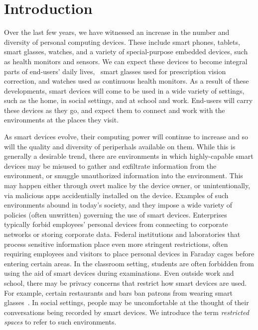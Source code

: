 \section{Introduction}
\label{section:introduction}

Over the last few years, we have witnessed an increase in the number and
diversity of personal computing devices. These include smart phones, tablets,
smart glasses, watches, and a variety of special-purpose embedded devices, such
as health monitors and sensors. We can expect these devices to become integral
parts of end-users' daily lives, \eg~smart glasses used for prescription vision
correction, and watches used as continuous health monitors. As a result of
these developments, smart devices will come to be used in a wide variety of
settings, such as the home, in social settings, and at school and work.
End-users will carry these devices as they go, and expect them to connect and
work with the environments at the places they visit.

%
As smart devices evolve, their computing power will continue to increase and so
will the quality and diversity of periperhals available on them. While this is
generally a desirable trend, there are environments in which highly-capable
smart devices may be misused to gather and exfiltrate information from the
environment, or smuggle unauthorized information into the environment. This may
happen either through overt malice by the device owner, or unintentionally, via
malicious apps accidentially installed on the device. Examples of such
environments abound in today's society, and they impose a wide variety of
policies (often unwritten) governing the use of smart devices. Enterprises
typically forbid employees' personal devices from connecting to corporate
networks or storing corporate data. Federal institutions and laboratories that
process sensitive information place even more stringent restrictions, often
requiring employees and visitors to place personal devices in Faraday cages
before entering certain areas. In the classroom setting, students are often
forbidden from using the aid of smart devices during examinations. Even outside
work and school, there may be privacy concerns that restrict how smart devices
are used. For example, certain restaurants and bars ban patrons from wearing
smart glasses~\cite{url:glassban}. In social settings, people may be
uncomfortable at the thought of their conversations being recorded by smart
devices.  We introduce the term \textit{restricted spaces} to refer to such
environments.

